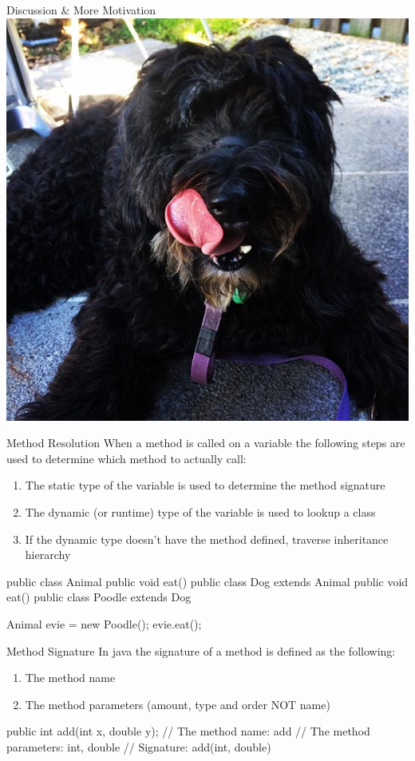 \documentclass[week3]{csse2002}
\begin{document}
\begin{topic}{Discussion \& More Motivation}
\includegraphics[width=\textwidth,keepaspectratio]{doggo2.jpg}
\end{topic}

\begin{topic}{Method Resolution}
When a method is called on a variable the following steps are used to determine
which method to actually call:
\begin{enumerate}
	\item The static type of the variable is used to determine the method signature
	\item The dynamic (or runtime) type of the variable is used to lookup a class
	\item If the dynamic type doesn't have the method defined, traverse inheritance hierarchy
\end{enumerate}

\begin{java}
public class Animal {
	public void eat() {}
}
public class Dog extends Animal {
	public void eat() {}
}
public class Poodle extends Dog {}

Animal evie = new Poodle();
evie.eat();
\end{java}
\end{topic}

\begin{topic}{Method Signature}
In java the signature of a method is defined as the following:
\begin{enumerate}
	\item The method name
	\item The method parameters (amount, type and order NOT name)
\end{enumerate}

\begin{java}
public int add(int x, double y);
// The method name: add
// The method parameters: int, double
// Signature: add(int, double)
\end{java}
\end{topic}
\end{document}
